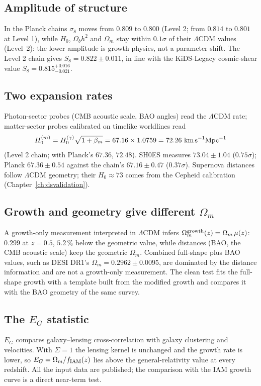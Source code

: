 \subsection{Amplitude of structure}
In the Planck chains $\sigma_8$ moves from $0.809$ to $0.800$ (Level 2; from $0.814$ to $0.801$ at Level 1), while $H_0$, $\Omega_bh^2$ and $\Omega_m$ stay within $0.1\sigma$
of their $\Lambda$CDM values (Level~2): the lower amplitude is growth physics, not a parameter shift. The Level 2 chain gives $S_8=0.822\pm0.011$, in line with the
KiDS-Legacy cosmic-shear value $S_8=0.815^{+0.016}_{-0.021}$.

\subsection{Two expansion rates}
Photon-sector probes (CMB acoustic scale, BAO angles) read the $\Lambda$CDM rate; matter-sector probes calibrated on timelike worldlines read
\begin{equation}
H_0^{(m)}=H_0^{(\gamma)}\sqrt{1+\beta_m}=67.16\times1.0759=72.26\ \text{km\,s}^{-1}\text{Mpc}^{-1}
\end{equation}
(Level 2 chain; with Planck's $67.36$, $72.48$). SH0ES measures $73.04\pm1.04$ ($0.75\sigma$); Planck $67.36\pm0.54$ against the chain's $67.16\pm0.47$
($0.37\sigma$). Supernova distances follow $\Lambda$CDM geometry; their $H_0\approx73$ comes from the Cepheid calibration (Chapter~\ref{ch:dsvalidation}).

\subsection{Growth and geometry give different $\Omega_m$}
A growth-only measurement interpreted in $\Lambda$CDM infers $\Omega_m^{\rm growth}(z)=\Omega_m\,\mu(z)$: $0.299$ at $z=0.5$, $5.2\,\%$ below the
geometric value, while distances (BAO, the CMB acoustic scale) keep the geometric $\Omega_m$. Combined full-shape plus BAO values, such as DESI DR1's
$\Omega_m=0.2962\pm0.0095$, are dominated by the distance information and are not a growth-only measurement. The clean test fits the full-shape growth
with a template built from the modified growth and compares it with the BAO geometry of the same survey.

\subsection{The $E_G$ statistic}
$E_G$ compares galaxy--lensing cross-correlation with galaxy clustering and velocities. With $\Sigma=1$ the lensing kernel is unchanged and the growth rate is
lower, so $E_G=\Omega_m/f_{\rm IAM}(z)$ lies above the general-relativity value at every redshift. All the input data are published; the comparison with the
IAM growth curve is a direct near-term test.


